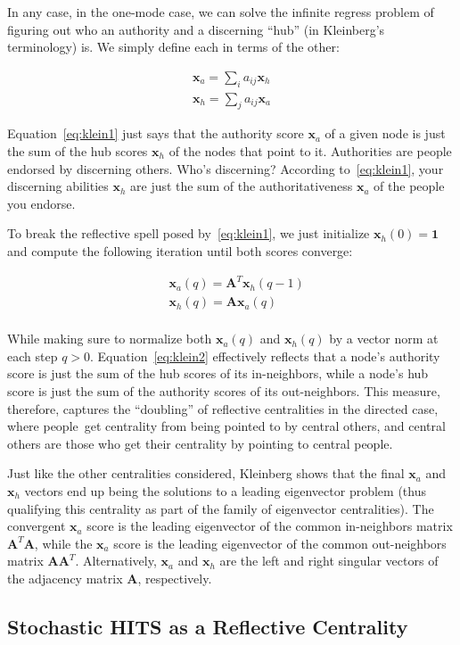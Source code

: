 \documentclass[a4paper,fleqn]{cas-sc}
\begin{document}
In any case, in the one-mode case, we can solve the infinite regress problem of figuring out who an authority and a discerning ``hub'' (in Kleinberg's terminology) is. We simply define each in terms of the other:

\begin{equation}
    \begin{split}
    \mathbf{x}_a = \sum_i  a_{ij} \mathbf{x}_h \\
    \mathbf{x}_h = \sum_j a_{ij} \mathbf{x}_a 
    \end{split}
    \label{eq:klein1}
\end{equation}

Equation~\ref{eq:klein1} just says that the authority score $\mathbf{x}_a$ of a given node is just the sum of the hub scores $\mathbf{x}_h$ of the nodes that point to it. Authorities are people endorsed by discerning others. Who's discerning? According to~\ref{eq:klein1}, your discerning abilities $\mathbf{x}_h$ are just the sum of the authoritativeness $\mathbf{x}_a$ of the people you endorse.

To break the reflective spell posed by~\ref{eq:klein1}, we just initialize $\mathbf{x}_h(0) = \mathbf{1}$ and compute the following iteration until both scores converge:

\begin{equation}
    \begin{split}
        &\mathbf{x}_a(q) = \mathbf{A}^T\mathbf{x}_h(q-1) \\
        &\mathbf{x}_h(q) = \mathbf{A}\mathbf{x}_a(q) \\
    \end{split}
    \label{eq:klein2}
\end{equation}

While making sure to normalize both $\mathbf{x}_a(q)$ and $\mathbf{x}_h(q)$ by a vector norm at each step $q > 0$. Equation~\ref{eq:klein2} effectively reflects that a node's authority score is just the sum of the hub scores of its in-neighbors, while a node's hub score is just the sum of the authority scores of its out-neighbors. This measure, therefore, captures the ``doubling'' of reflective centralities in the directed case, where people\ get centrality from being pointed to by central others, and central others are those who get their centrality by pointing to central people. 

Just like the other centralities considered, Kleinberg shows that the final $\mathbf{x}_a$ and $\mathbf{x}_h$ vectors end up being the solutions to a leading eigenvector problem (thus qualifying this centrality as part of the family of eigenvector centralities). The convergent $\mathbf{x}_a$ score is the leading eigenvector of the common in-neighbors matrix $\mathbf{A}^T\mathbf{A}$, while the $\mathbf{x}_a$ score is the leading eigenvector of the common out-neighbors matrix $\mathbf{A}\mathbf{A}^T$. Alternatively, $\mathbf{x}_a$ and $\mathbf{x}_h$ are the left and right singular vectors of the adjacency matrix $\mathbf{A}$, respectively.

\subsection{Stochastic HITS as a Reflective Centrality}



% 



\end{document}

